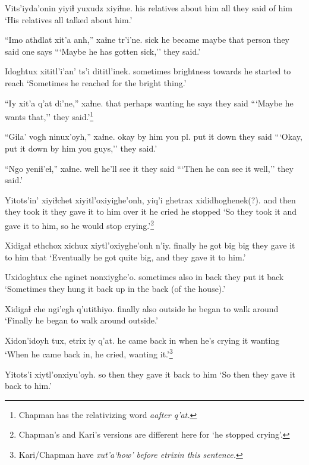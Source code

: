 \documentclass[12pt]{article}
\begin{document}
\gll Vits'iyda'onin yiyiɬ yuxudz xiyiɬne.
{his relatives} {about him} all {they said of him}
\glt `His relatives all talked about him.'
\glend

\gll ``Imo athdlat xit'a anh,''  xaɬne  tr'i'ne.
sick {he became} maybe {that person} {they said} {one says}
\glt ```Maybe he has gotten sick,'' they said.'
\glend

\gll Idoghtux xititl'i'an' ts'i dititl'inek.
sometimes brightness towards {he started to reach}
\glt `Sometimes he reached for the bright thing.'
\glend

\gll ``Iy xit'a q'at di'ne,'' xaɬne.
that perhaps wanting {he says} {they said}
\glt ```Maybe he wants that,'' they said.'\footnote{Chapman has the relativizing word \em a\em after \em q'at.}
\glend

\gll ``Gila' vogh ninux'oyh,'' xaɬne.
okay {by him} {you pl. put it down} {they said}
\glt ```Okay, put it down by him you guys,'' they said.'
\glend

\gll ``Ngo yeniɬ'eɬ,'' xaɬne.
well {he'll see it} {they said}
\glt ```Then he can see it well,'' they said.'
\glend

\gll Yitots'in' xiyiɬchet xiyitl'oxiyighe'onh, yiq'i ghetrax xididhoghenek(?).
{and then} {they took it} {they gave it to him} {over it} {he cried} {he stopped}
\glt `So they took it and gave it to him, so he would stop crying.'\footnote{Chapman's and Kari's versions are different here for `he stopped crying'.}
\glend

\gll Xidigaɬ ethchox xichux xiytl'oxiyghe'onh n'iy.
finally  {he got big} big {they gave it to him} that
\glt `Eventually he got quite big, and they gave it to him.'
\glend

\gll Uxidoghtux che nginet nonxiyghe'o.
sometimes also {in back} {they put it back}
\glt `Sometimes they hung it back up in the back (of the house).'
\glend

\gll Xidigaɬ che ngi'egh q'utithiyo.
finally  also outside  {he began to walk around}
\glt `Finally he began to walk around outside.'
\glend

\gll Xidon'idoyh tux, etrix  iy q'at.
{he came back in} when {he's crying} it wanting
\glt `When he came back in, he cried, wanting it.'\footnote{Kari/Chapman have \em xut'a\em `how' before \em etrix\em in this sentence.}
\glend

\gll Yitots'i xiytl'onxiyu'oyh.
{so then} {they gave it back to him}
\glt `So then they gave it back to him.'
\glend
\end{document}
